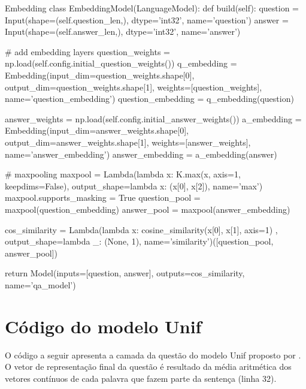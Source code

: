 \begin{mypython-linenumber}{Embedding}
class EmbeddingModel(LanguageModel):
    def build(self):
        question = Input(shape=(self.question_len,), dtype='int32', name='question')
        answer = Input(shape=(self.answer_len,), dtype='int32', name='answer')

        # add embedding layers
        question_weights = np.load(self.config.initial_question_weights())
        q_embedding = Embedding(input_dim=question_weights.shape[0],
                                output_dim=question_weights.shape[1],
                                weights=[question_weights],
                                name='question_embedding')
        question_embedding = q_embedding(question)

        answer_weights = np.load(self.config.initial_answer_weights())
        a_embedding = Embedding(input_dim=answer_weights.shape[0],
                                output_dim=answer_weights.shape[1],
                                weights=[answer_weights],
                                name='answer_embedding')
        answer_embedding = a_embedding(answer)

        # maxpooling
        maxpool = Lambda(lambda x: K.max(x, axis=1, keepdims=False), output_shape=lambda x: (x[0], x[2]),
                         name='max')
        maxpool.supports_masking = True
        question_pool = maxpool(question_embedding)
        answer_pool = maxpool(answer_embedding)
        
        cos_similarity = Lambda(lambda x: cosine_similarity(x[0], x[1], axis=1)
                                       , output_shape=lambda _: (None, 1), name='similarity')([question_pool,
                                                                                               answer_pool])

        return Model(inputs=[question, answer], outputs=cos_similarity,
                                   name='qa_model')

\end{mypython-linenumber}

\vspace{2cm}

\section{Código do modelo Unif}

O código a seguir apresenta a camada da questão do modelo Unif proposto por \cite{cambronero-deep-learning-code-search:2019}. O vetor de representação final da questão é resultado da média aritmética dos vetores contínuos de cada palavra que fazem parte da sentença (linha 32).

